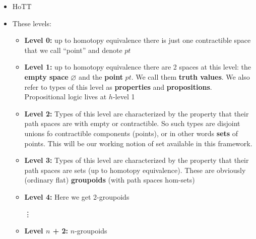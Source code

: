 \documentclass[16pt]{beamer}
\newcommand{\tab}{\hspace*{1cm}}
\begin{document}
\begin{frame}[plain]
\begin{itemize}
	\item HoTT

	\item These levels:
	\begin{itemize}
		\item \textbf{Level 0:} up to homotopy equivalence there is just one contractible space that we call ``point'' and denote $pt$
		
		\item \textbf{Level 1:} up to homotopy equivalence there are 2 spaces at this level:  the \textbf{empty space} $\varnothing$ and the \textbf{point} $pt$.  We call them \textbf{truth values}.  We also refer to types of this level as \textbf{properties} and \textbf{propositions}.  Propositional logic lives at $h$-level 1
		
		\item \textbf{Level 2:}  Types of this level are characterized by the property that their path spaces are with empty or contractible.  So such types are disjoint unions fo contractible components (points), or in other words \textbf{sets} of points.  This will be our working notion of set available in this framework.
		
		\item \textbf{Level 3:}  Types of this level are characterized by the property that their path spaces are sets (up to homotopy equivalence).  These are obviously (ordinary flat) \textbf{groupoids} (with path spaces hom-sets)
		
		\item \textbf{Level 4:}  Here we get 2-groupoids
		
		\tab \vdots
		\item \textbf{Level $n$ + 2:}  $n$-groupoids
	\end{itemize}
\end{itemize}
\end{frame}
\end{document}
